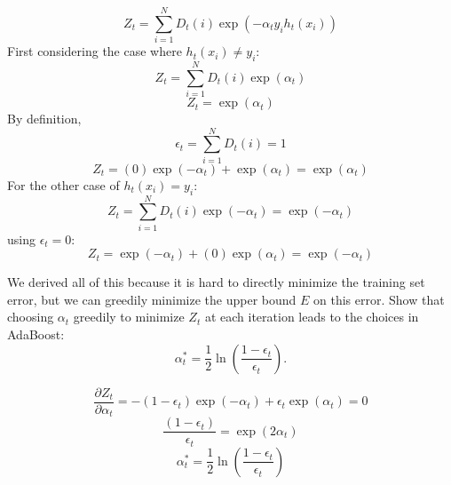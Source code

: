 \begin{solution}
	\begin{equation}
        Z_t = \sum\limits_{i=1}^N D_t(i) \exp(-\alpha_{t}y_{i}h_{t}(x_{i}))
    \end{equation}
    First considering the case where $h_t(x_i)\neq y_i$:
    \begin{equation}
        Z_t = \sum\limits_{i=1}^N D_t(i) \exp(\alpha_{t})
    \end{equation}
    \begin{equation}
        Z_t = \exp(\alpha_{t})
    \end{equation}
    By definition,
    \begin{equation}
        \epsilon_t = \sum\limits_{i=1}^N D_t(i) = 1
    \end{equation}
    \begin{equation}
        Z_t = (0)\exp(-\alpha_t)+\exp(\alpha_t)=\exp(\alpha_t)
    \end{equation}
    For the other case of $h_t(x_i)= y_i$:
    \begin{equation}
        Z_t = \sum\limits_{i=1}^N D_t(i) \exp(-\alpha_{t})=\exp(-\alpha_{t})
    \end{equation}
    using $\epsilon_t=0$:
    \begin{equation}
        Z_t = \exp(-\alpha_t)+(0)\exp(\alpha_t)=\exp(-\alpha_t)
    \end{equation}
\end{solution}

\problem[2]
We derived all of this because it is hard to directly minimize the training set error, but we can greedily minimize the upper bound $E$ on this error. Show that choosing $\alpha_t$
greedily to minimize $Z_t$ at each iteration leads to the choices in
AdaBoost:
$$\alpha_{t}^* = \frac{1}{2} \ln \left(\frac{1 - \epsilon_t}{\epsilon_t} \right).$$

\begin{solution}
    \begin{equation}
        \frac{\partial Z_t}{\partial\alpha_t} = -(1-\epsilon_t)\exp(-\alpha_t)+\epsilon_t\exp(\alpha_t) = 0
    \end{equation}
    \begin{equation}
        \frac{(1-\epsilon_t)}{\epsilon_t} = \exp(2\alpha_t)
    \end{equation}
    \begin{equation}
        \alpha_t^* = \frac{1}{2}\ln \left(\frac{1 - \epsilon_t}{\epsilon_t} \right)
    \end{equation}
\end{solution}

